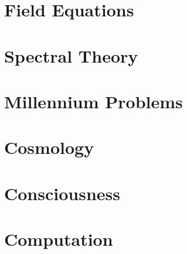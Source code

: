 \documentclass[11pt,letterpaper,openany]{book}
\begin{document}
\part{Field Equations}









\part{Spectral Theory}





\part{Millennium Problems}







\part{Cosmology}





\part{Consciousness}




\part{Computation}




\end{document}

